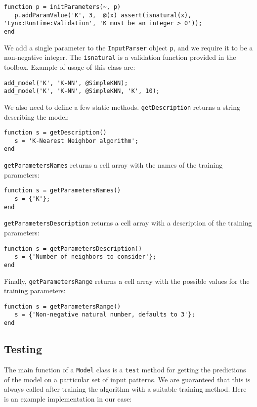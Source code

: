 \begin{lstlisting}
function p = initParameters(~, p)
   p.addParamValue('K', 3,  @(x) assert(isnatural(x), 'Lynx:Runtime:Validation', 'K must be an integer > 0'));
end
\end{lstlisting}

\noindent We add a single parameter to the \verb|InputParser| object \verb|p|, and we require it to be a non-negative integer. The \verb|isnatural| is a validation function provided in the toolbox. Example of usage of this class are:

\begin{lstlisting}
add_model('K', 'K-NN', @SimpleKNN);
add_model('K', 'K-NN', @SimpleKNN, 'K', 10);
\end{lstlisting}

\noindent We also need to define a few static methods. \verb|getDescription| returns a string describing the model:

\begin{lstlisting}
function s = getDescription()
   s = 'K-Nearest Neighbor algorithm';
end
\end{lstlisting}

\noindent \verb|getParametersNames| returns a cell array with the names of the training parameters:

\begin{lstlisting}
function s = getParametersNames()
   s = {'K'};
end
\end{lstlisting}

\noindent \verb|getParametersDescription| returns a cell array with a description of the training parameters:

\begin{lstlisting}
function s = getParametersDescription()
   s = {'Number of neighbors to consider'};
end
\end{lstlisting}

\noindent Finally, \verb|getParametersRange| returns a cell array with the possible values for the training parameters:

\begin{lstlisting}
function s = getParametersRange()
   s = {'Non-negative natural number, defaults to 3'};
end
\end{lstlisting}

\subsection{Testing}

The main function of a \verb|Model| class is a \verb|test| method for getting the predictions of the model on a particular set of input patterns. We are guaranteed that this is always called after training the algorithm with a suitable training method. Here is an example implementation in our case:

